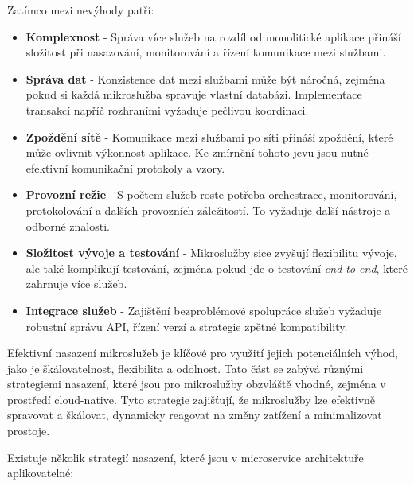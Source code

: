 Zatímco mezi nevýhody patří:

\begin{itemize}

\item \textbf{Komplexnost} - Správa více služeb na rozdíl od monolitické aplikace přináší složitost při nasazování, monitorování a řízení komunikace mezi službami.

\item \textbf{Správa dat} - Konzistence dat mezi službami může být náročná, zejména pokud si každá mikroslužba spravuje vlastní databázi. Implementace transakcí napříč rozhraními vyžaduje pečlivou koordinaci.

\item \textbf{Zpoždění sítě} - Komunikace mezi službami po síti přináší zpoždění, které může ovlivnit výkonnost aplikace. Ke zmírnění tohoto jevu jsou nutné efektivní komunikační protokoly a vzory.

\item \textbf{Provozní režie} - S počtem služeb roste potřeba orchestrace, monitorování, protokolování a dalších provozních záležitostí. To vyžaduje další nástroje a odborné znalosti.

\item \textbf{Složitost vývoje a testování} - Mikroslužby sice zvyšují flexibilitu vývoje, ale také komplikují testování, zejména pokud jde o testování \emph{end-to-end}, které zahrnuje více služeb.

\item \textbf{Integrace služeb} - Zajištění bezproblémové spolupráce služeb vyžaduje robustní správu API, řízení verzí a strategie zpětné kompatibility.

\end{itemize}


Efektivní nasazení mikroslužeb je klíčové pro využití jejich potenciálních výhod, jako je škálovatelnost, flexibilita a odolnost. Tato část se zabývá různými strategiemi nasazení, které jsou pro mikroslužby obzvláště vhodné, zejména v prostředí cloud-native. Tyto strategie zajišťují, že mikroslužby lze efektivně spravovat a škálovat, dynamicky reagovat na změny zatížení a minimalizovat prostoje. \cite{Williams2023}


Existuje několik strategií nasazení, které jsou v microservice architektuře aplikovatelné:

